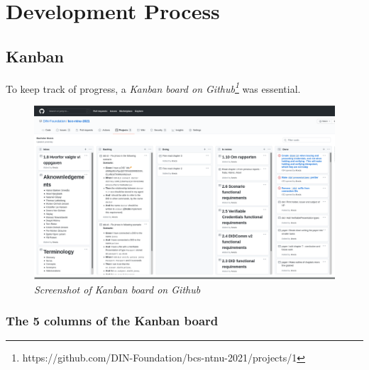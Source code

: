 \chapter{Development Process}


\section{Kanban}

To keep track of progress, a \textit{Kanban board on Github\footnote{https://github.com/DIN-Foundation/bcs-ntnu-2021/projects/1}} was essential.

\begin{figure}[htbp]
  \centering
  \includegraphics[width=1\textwidth]{figures/github-kanban}
  \caption{\textit{Screenshot of Kanban board on Github}}
\end{figure}



\subsection{The 5 columns of the Kanban board}

